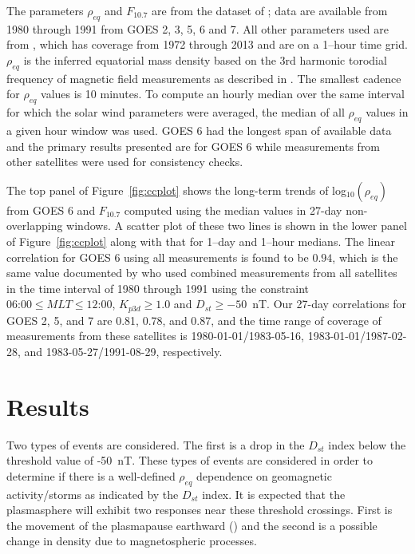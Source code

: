 \documentclass[12pt]{article}
\begin{document}
The parameters $\rho_{eq}$ and $F_{10.7}$ are from the dataset of \cite{Takahashi2010}; data are available from 1980 through 1991 from GOES 2, 3, 5, 6 and 7.  All other parameters used are from \cite{Kondrashov2014ReconstructionOfGaps}, which has coverage from 1972 through 2013 and are on a 1--hour time grid. $\rho_{eq}$ is the inferred equatorial mass density based on the 3rd harmonic torodial frequency of magnetic field measurements as described in \cite{Takahashi2010}.  The smallest cadence for $\rho_{eq}$ values is 10 minutes.  To compute an hourly median over the same interval for which the solar wind parameters were averaged, the median of all $\rho_{eq}$ values in a given hour window was used. GOES 6 had the longest span of available data and the primary results presented are for GOES 6 while measurements from other satellites were used for consistency checks.


The top panel of Figure~\ref{fig:ccplot} shows the long-term trends of log$_{10}(\rho_{eq})$ from GOES 6 and $F_{10.7}$ computed using the median values in 27-day non-overlapping windows.  A scatter plot of these two lines is shown in the lower panel of Figure~\ref{fig:ccplot} along with that for 1--day and 1--hour medians.  The linear correlation for GOES 6 using all measurements is found to be $0.94$, which is the same value documented by \cite{Takahashi2010} who used combined measurements from all satellites in the time interval of 1980 through 1991 using the constraint $06\mbox{:}00 \leq MLT \le 12\mbox{:}00$, $K_{p3d}\ge1.0$ and $D_{st}\ge -50$~nT.  Our 27-day correlations for GOES 2, 5, and 7 are 0.81, 0.78, and 0.87, and the time range of coverage of measurements from these satellites is 1980-01-01/1983-05-16, 1983-01-01/1987-02-28, and 1983-05-27/1991-08-29, respectively.

\section{Results}

Two types of events are considered. The first is a drop in the $D_{st}$ index below the threshold value of -50~nT. These types of events are considered in order to determine if there is a well-defined $\rho_{eq}$ dependence on geomagnetic activity/storms as indicated by the $D_{st}$ index.  It is expected that the plasmasphere will exhibit two responses near these threshold crossings.  First is the movement of the plasmapause earthward (\cite{LemaireEarthsPlasmasphere}) and the second is a possible change in density due to magnetospheric processes. 
\end{document}
